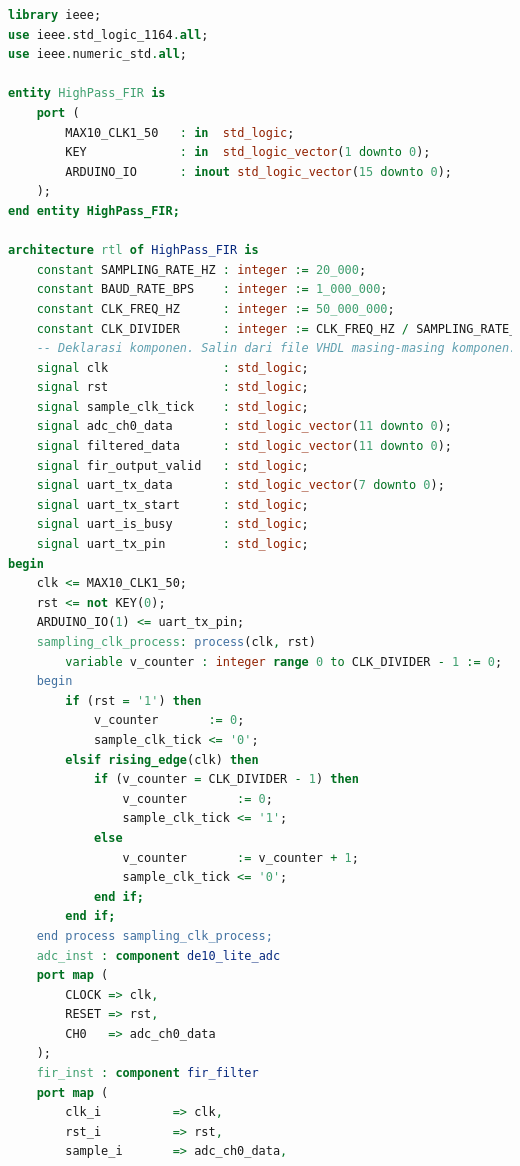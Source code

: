 \documentclass[a4paper,12pt]{article}
\begin{document}
\vspace{-1.5em}
\begin{center}
\end{center}
\vspace{-1.5em}

\begin{lstlisting}[language=VHDL, basicstyle=\tiny, lineskip=0em,belowskip=0em,aboveskip=0em, frame=single]
library ieee;
use ieee.std_logic_1164.all;
use ieee.numeric_std.all;

entity HighPass_FIR is
    port (
        MAX10_CLK1_50   : in  std_logic;
        KEY             : in  std_logic_vector(1 downto 0);
        ARDUINO_IO      : inout std_logic_vector(15 downto 0);
    );
end entity HighPass_FIR;

architecture rtl of HighPass_FIR is
    constant SAMPLING_RATE_HZ : integer := 20_000;
    constant BAUD_RATE_BPS    : integer := 1_000_000;
    constant CLK_FREQ_HZ      : integer := 50_000_000;
    constant CLK_DIVIDER      : integer := CLK_FREQ_HZ / SAMPLING_RATE_HZ;
    -- Deklarasi komponen. Salin dari file VHDL masing-masing komponen.
    signal clk                : std_logic;
    signal rst                : std_logic;
    signal sample_clk_tick    : std_logic;
    signal adc_ch0_data       : std_logic_vector(11 downto 0);
    signal filtered_data      : std_logic_vector(11 downto 0);
    signal fir_output_valid   : std_logic;
    signal uart_tx_data       : std_logic_vector(7 downto 0);
    signal uart_tx_start      : std_logic;
    signal uart_is_busy       : std_logic;
    signal uart_tx_pin        : std_logic;
begin
    clk <= MAX10_CLK1_50;
    rst <= not KEY(0);
    ARDUINO_IO(1) <= uart_tx_pin;
    sampling_clk_process: process(clk, rst)
        variable v_counter : integer range 0 to CLK_DIVIDER - 1 := 0;
    begin
        if (rst = '1') then
            v_counter       := 0;
            sample_clk_tick <= '0';
        elsif rising_edge(clk) then
            if (v_counter = CLK_DIVIDER - 1) then
                v_counter       := 0;
                sample_clk_tick <= '1';
            else
                v_counter       := v_counter + 1;
                sample_clk_tick <= '0';
            end if;
        end if;
    end process sampling_clk_process;
    adc_inst : component de10_lite_adc
    port map (
        CLOCK => clk,
        RESET => rst,
        CH0   => adc_ch0_data
    );
    fir_inst : component fir_filter
    port map (
        clk_i          => clk,
        rst_i          => rst,
        sample_i       => adc_ch0_data,

\end{lstlisting}
\end{document}
